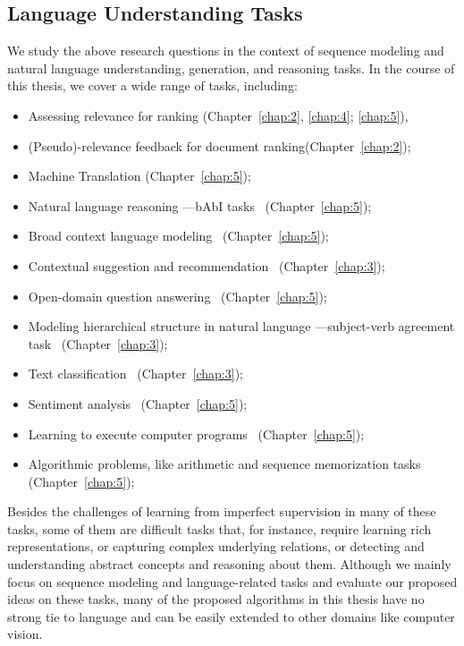 \subsection{Language Understanding Tasks}
We study the above research questions in the context of sequence modeling and natural language understanding, generation, and reasoning tasks. In the course of this thesis, we cover a wide range of tasks, including:
\begin{itemize}
\item 
Assessing relevance for ranking (Chapter~\ref{chap:2}, \ref{chap:4}; \ref{chap:5}), 
%
\item 
(Pseudo)-relevance feedback for document ranking(Chapter~\ref{chap:2});
%
\item 
Machine Translation (Chapter~\ref{chap:5});
%
\item 
Natural language reasoning ---bAbI tasks~\citep{weston2015towards} (Chapter~\ref{chap:5});
%
\item 
Broad context language modeling~\citep{paperno2016lambada} (Chapter~\ref{chap:5});
%
\item 
Contextual suggestion and recommendation~\citep{hashemioverview} (Chapter~\ref{chap:3});
%
\item 
Open-domain question answering~\citep{dunn2017searchqa, dhingra2017quasar} (Chapter~\ref{chap:5});
%
\item 
Modeling hierarchical structure in natural language ---subject-verb agreement task~\citep{linzen2016assessing} (Chapter~\ref{chap:3});
%
\item 
Text classification~\citep{Hirst:2014} (Chapter~\ref{chap:3});
%
\item 
Sentiment analysis~\citep{rosenthal2017semeval, Nakov:2016, rosenthal:2015} (Chapter~\ref{chap:5}); 
%
\item 
Learning to execute computer programs~\citep{ZS14} (Chapter~\ref{chap:5}); 
%
\item 
Algorithmic problems, like arithmetic and sequence memorization tasks ~\citep{neural_gpu} (Chapter~\ref{chap:5});
\end{itemize}

Besides the challenges of learning from imperfect supervision in many of these tasks, some of them are difficult tasks that, for instance, require learning rich representations, or capturing complex underlying relations, or detecting and understanding abstract concepts and reasoning about them.
%
Although we mainly focus on sequence modeling and language-related tasks and evaluate our proposed ideas on these tasks, many of the proposed algorithms in this thesis have no strong tie to language and can be easily extended to other domains like computer vision.
%

